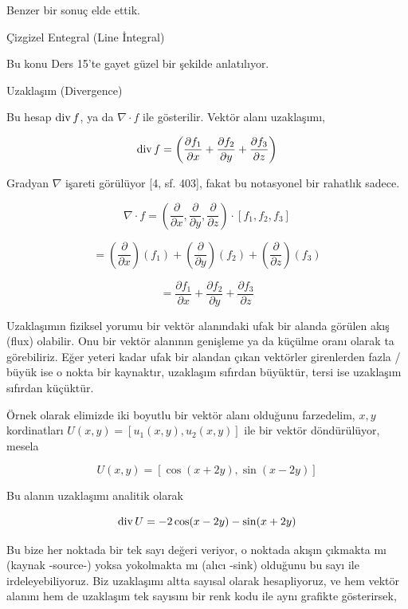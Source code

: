 \documentclass[12pt,fleqn]{article}\usepackage{../../common}
\begin{document}
Benzer bir sonuç elde ettik.

Çizgizel Entegral (Line İntegral)

Bu konu Ders 15'te gayet güzel bir şekilde anlatılıyor. 

Uzaklaşım (Divergence)

Bu hesap $\operatorname{div} f$, ya da $\nabla \cdot f$ ile gösterilir. Vektör alanı
uzaklaşımı,

$$
\operatorname{div} f = \left(
\frac{\partial f_1}{\partial x} + 
\frac{\partial f_2}{\partial y} + 
\frac{\partial f_3}{\partial z} 
\right)
$$

Gradyan $\nabla$ işareti görülüyor [4, sf. 403], fakat bu notasyonel bir
rahatlık sadece.

$$
\nabla \cdot f = \left(
\frac{\partial }{\partial x},
\frac{\partial }{\partial y},
\frac{\partial }{\partial z} 
\right) 
\cdot
\left[ f_1, f_2, f_3 \right]
$$

$$
= \left( \frac{\partial }{\partial x} \right)(f_1) + 
\left( \frac{\partial }{\partial y} \right)(f_2) + 
\left( \frac{\partial }{\partial z} \right)(f_3) 
$$

$$
= \frac{\partial f_1}{\partial x} +
\frac{\partial f_2}{\partial y} +
\frac{\partial f_3}{\partial z}
$$

Uzaklaşımın fiziksel yorumu bir vektör alanındaki ufak bir alanda görülen akış
(flux) olabilir. Onu bir vektör alanının genişleme ya da küçülme oranı olarak ta
görebiliriz. Eğer yeteri kadar ufak bir alandan çıkan vektörler girenlerden
fazla / büyük ise o nokta bir kaynaktır, uzaklaşım sıfırdan büyüktür, tersi ise
uzaklaşım sıfırdan küçüktür.

Örnek olarak elimizde iki boyutlu bir vektör alanı olduğunu farzedelim, $x,y$
kordinatları $U(x,y) = [u_1(x,y), u_2(x,y)]$ ile bir vektör döndürülüyor, mesela

$$
U(x,y) = [\cos(x + 2y), \sin(x - 2y)]
$$

Bu alanın uzaklaşımı analitik olarak

$$
\operatorname{div} U = - 2\cos(x - 2y) - \sin(x + 2y)
$$

Bu bize her noktada bir tek sayı değeri veriyor, o noktada akışın çıkmakta mı
(kaynak -source-) yoksa yokolmakta mı (alıcı -sink) olduğunu bu sayı ile
irdeleyebiliyoruz. Biz uzaklaşımı altta sayısal olarak hesapliyoruz, ve hem
vektör alanını hem de uzaklaşım tek sayısını bir renk kodu ile aynı grafikte
gösterirsek,
\end{document}
